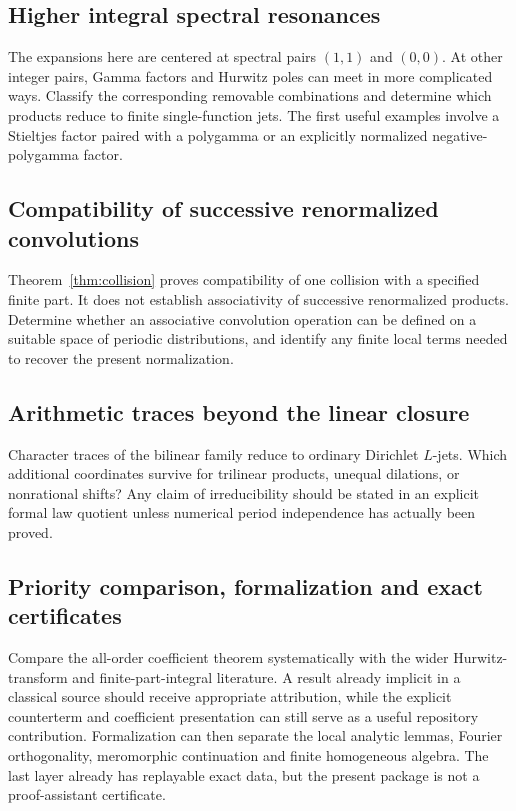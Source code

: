 \documentclass[11pt]{article}
\numberwithin{equation}{section}
\theoremstyle{definition}
\theoremstyle{remark}
\begin{document}
\subsection{Higher integral spectral resonances}
The expansions here are centered at spectral pairs $(1,1)$ and $(0,0)$.
At other integer pairs, Gamma factors and Hurwitz poles can meet in
more complicated ways. Classify the corresponding removable combinations
and determine which products reduce to finite single-function jets.
The first useful examples involve a Stieltjes factor paired with a
polygamma or an explicitly normalized negative-polygamma factor.

\subsection{Compatibility of successive renormalized convolutions}
Theorem~\ref{thm:collision} proves compatibility of one collision with a
specified finite part. It does not establish associativity of successive
renormalized products. Determine whether an associative convolution
operation can be defined on a suitable space of periodic distributions,
and identify any finite local terms needed to recover the present
normalization.

\subsection{Arithmetic traces beyond the linear closure}
Character traces of the bilinear family reduce to ordinary Dirichlet
$L$-jets. Which additional coordinates survive for trilinear products,
unequal dilations, or nonrational shifts? Any claim of irreducibility
should be stated in an explicit formal law quotient unless numerical
period independence has actually been proved.

\subsection{Priority comparison, formalization and exact certificates}
Compare the all-order coefficient theorem systematically with the wider
Hurwitz-transform and finite-part-integral literature. A result already
implicit in a classical source should receive appropriate attribution,
while the explicit counterterm and coefficient presentation can still
serve as a useful repository contribution. Formalization can then
separate the local analytic lemmas, Fourier orthogonality, meromorphic
continuation and finite homogeneous algebra. The last layer already has
replayable exact data, but the present package is not a proof-assistant
certificate.
\end{document}
